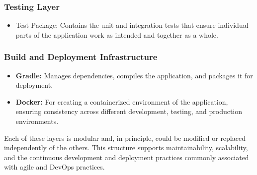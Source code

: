 \subsubsection{Testing Layer}

\begin{itemize}

\item Test Package: Contains the unit and integration tests that ensure individual parts of the application work as intended and together as a whole.    

\end{itemize}

\subsubsection{Build and Deployment Infrastructure}

\begin{itemize}

\item \textbf{Gradle:} Manages dependencies, compiles the application, and packages it for deployment.
\item \textbf{Docker:} For creating a containerized environment of the application, ensuring consistency across different development, testing, and production environments.    
\end{itemize}

Each of these layers is modular and, in principle, could be modified or replaced independently of the others. This structure supports maintainability, scalability, and the continuous development and deployment practices commonly associated with agile and DevOps practices.

